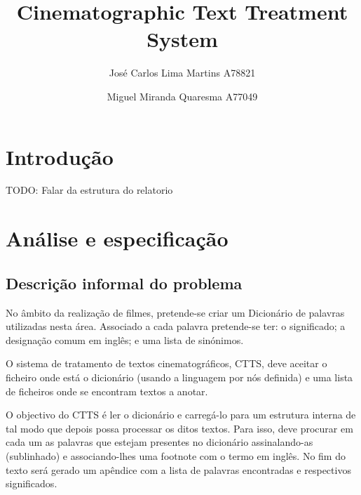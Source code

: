 \documentclass{llncs}
\begin{document}
 \mainmatter
\title{Cinematographic Text Treatment System}
\author{José Carlos Lima Martins A78821 \and
        Miguel Miranda Quaresma A77049}

\maketitle

\justify

\begin{abstract}

\end{abstract}

\section{Introdução}
TODO: Falar da estrutura do relatorio

\section{Análise e especificação}

\subsection{Descrição informal do problema}
No âmbito da realização de filmes, pretende-se criar um Dicionário de palavras utilizadas nesta área. Associado a cada palavra pretende-se ter: o significado; a designação comum em inglês; e uma lista de sinónimos.

O sistema de tratamento de textos cinematográficos, CTTS, deve aceitar o ficheiro onde está o dicionário (usando a linguagem por nós definida) e uma lista de ficheiros onde se encontram textos a anotar.

O objectivo do CTTS é ler o dicionário e carregá-lo para um estrutura interna de tal modo que depois possa processar os ditos textos. Para isso, deve procurar em cada um as palavras que estejam presentes no dicionário assinalando-as (sublinhado) e associando-lhes uma footnote com o termo em inglês. No fim do texto será gerado um apêndice com a lista de palavras encontradas e respectivos significados.
\end{document}
